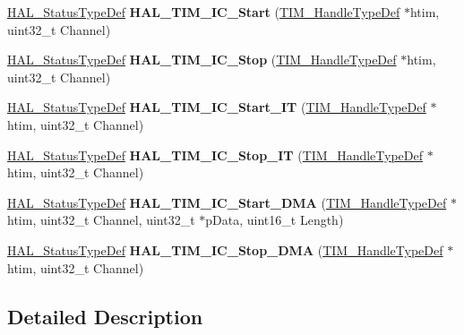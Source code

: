 \begin{DoxyCompactItemize}
\hyperlink{stm32f1xx__hal__def_8h_a63c0679d1cb8b8c684fbb0632743478f}{H\+A\+L\+\_\+\+Status\+Type\+Def} {\bfseries H\+A\+L\+\_\+\+T\+I\+M\+\_\+\+I\+C\+\_\+\+Start} (\hyperlink{struct_t_i_m___handle_type_def}{T\+I\+M\+\_\+\+Handle\+Type\+Def} $\ast$htim, uint32\+\_\+t Channel)
\item 
\mbox{\label{group___t_i_m___exported___functions___group4_ga1b5edb103cb27dbd5380e9b24d12658f}} 
\hyperlink{stm32f1xx__hal__def_8h_a63c0679d1cb8b8c684fbb0632743478f}{H\+A\+L\+\_\+\+Status\+Type\+Def} {\bfseries H\+A\+L\+\_\+\+T\+I\+M\+\_\+\+I\+C\+\_\+\+Stop} (\hyperlink{struct_t_i_m___handle_type_def}{T\+I\+M\+\_\+\+Handle\+Type\+Def} $\ast$htim, uint32\+\_\+t Channel)
\item 
\mbox{\label{group___t_i_m___exported___functions___group4_gac0e3515f374ec6b9d30609cd683649d6}} 
\hyperlink{stm32f1xx__hal__def_8h_a63c0679d1cb8b8c684fbb0632743478f}{H\+A\+L\+\_\+\+Status\+Type\+Def} {\bfseries H\+A\+L\+\_\+\+T\+I\+M\+\_\+\+I\+C\+\_\+\+Start\+\_\+\+IT} (\hyperlink{struct_t_i_m___handle_type_def}{T\+I\+M\+\_\+\+Handle\+Type\+Def} $\ast$htim, uint32\+\_\+t Channel)
\item 
\mbox{\label{group___t_i_m___exported___functions___group4_gaf5664e207667c99ef50378813056e5f6}} 
\hyperlink{stm32f1xx__hal__def_8h_a63c0679d1cb8b8c684fbb0632743478f}{H\+A\+L\+\_\+\+Status\+Type\+Def} {\bfseries H\+A\+L\+\_\+\+T\+I\+M\+\_\+\+I\+C\+\_\+\+Stop\+\_\+\+IT} (\hyperlink{struct_t_i_m___handle_type_def}{T\+I\+M\+\_\+\+Handle\+Type\+Def} $\ast$htim, uint32\+\_\+t Channel)
\item 
\mbox{\label{group___t_i_m___exported___functions___group4_gac3b7deffff43a8bdc3e2eea42115efff}} 
\hyperlink{stm32f1xx__hal__def_8h_a63c0679d1cb8b8c684fbb0632743478f}{H\+A\+L\+\_\+\+Status\+Type\+Def} {\bfseries H\+A\+L\+\_\+\+T\+I\+M\+\_\+\+I\+C\+\_\+\+Start\+\_\+\+D\+MA} (\hyperlink{struct_t_i_m___handle_type_def}{T\+I\+M\+\_\+\+Handle\+Type\+Def} $\ast$htim, uint32\+\_\+t Channel, uint32\+\_\+t $\ast$p\+Data, uint16\+\_\+t Length)
\item 
\mbox{\label{group___t_i_m___exported___functions___group4_ga8e7dc17f058ef9c826774436d68f80b5}} 
\hyperlink{stm32f1xx__hal__def_8h_a63c0679d1cb8b8c684fbb0632743478f}{H\+A\+L\+\_\+\+Status\+Type\+Def} {\bfseries H\+A\+L\+\_\+\+T\+I\+M\+\_\+\+I\+C\+\_\+\+Stop\+\_\+\+D\+MA} (\hyperlink{struct_t_i_m___handle_type_def}{T\+I\+M\+\_\+\+Handle\+Type\+Def} $\ast$htim, uint32\+\_\+t Channel)
\end{DoxyCompactItemize}


\subsection{Detailed Description}
